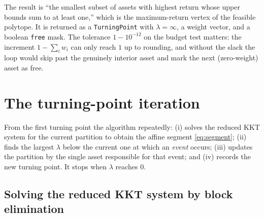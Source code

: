 \documentclass[11pt]{article}
\begin{document}
The result is ``the smallest subset of assets with highest return whose upper bounds
sum to at least one,'' which is the maximum-return vertex of the feasible polytope. It
is returned as a \texttt{TurningPoint} with $\lambda = \infty$, a weight vector, and a
boolean \texttt{free} mask. The tolerance $1-10^{-12}$ on the budget test matters: the
increment $1 - \sum_i w_i$ can only reach $1$ up to rounding, and without the slack the
loop would skip past the genuinely interior asset and mark the next (zero-weight) asset
as free.

\section{The turning-point iteration}

From the first turning point the algorithm repeatedly: (i) solves the reduced KKT
system for the current partition to obtain the affine segment \eqref{eq:segment};
(ii) finds the largest $\lambda$ below the current one at which an \emph{event}
occurs; (iii) updates the partition by the single asset responsible for that event;
and (iv) records the new turning point. It stops when $\lambda$ reaches $0$.

\subsection{Solving the reduced KKT system by block elimination}
\label{sec:blockelim}
\end{document}
